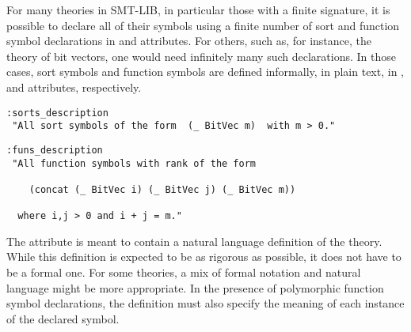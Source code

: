 For many theories in SMT-LIB, in particular those with a finite signature, 
it is possible to declare all of their symbols
using a finite number of sort and function symbol declarations
in  and  attributes.
For others, such as, for instance, the theory of bit vectors,
one would need infinitely many such declarations.
In those cases, 
sort symbols and function symbols are defined informally, in plain text,
in , and  attributes,
respectively.

\begin{lstlisting}[linewidth=39em]
:sorts_description
 "All sort symbols of the form  (_ BitVec m)  with m > 0."
\end{lstlisting}

\begin{lstlisting}[linewidth=35em]
:funs_description
 "All function symbols with rank of the form

    (concat (_ BitVec i) (_ BitVec j) (_ BitVec m))

  where i,j > 0 and i + j = m."
\end{lstlisting}
\medskip


The  attribute is meant to contain
a natural language definition of the theory.
While this definition is expected to be as rigorous as possible,
it does not have to be a formal one.
For some theories, 
a mix of formal notation and natural language might be more appropriate.
In the presence of polymorphic function symbol declarations,
the definition must also specify the meaning of each instance of the
declared symbol.

